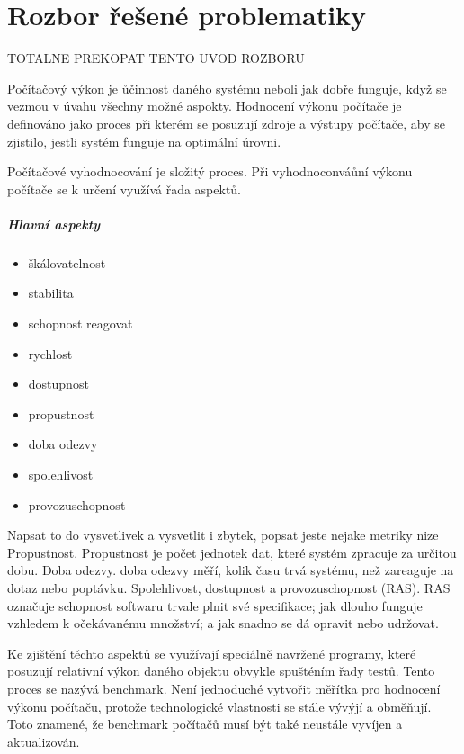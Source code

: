 \chapter{Rozbor řešené problematiky}

TOTALNE PREKOPAT TENTO UVOD ROZBORU

Počítačový výkon je ůčinnost daného systému neboli jak dobře funguje, když se vezmou v úvahu všechny možné aspokty.
Hodnocení výkonu počítače je definováno jako proces při kterém se posuzují zdroje a výstupy počítače, aby se zjistilo,
jestli systém funguje na optimální úrovni.

Počítačové vyhodnocování je složitý proces. Při vyhodnoconváůní výkonu počítače se k určení využívá řada aspektů.
\paragraph{Hlavní aspekty}\cite{MetricsToday}
\begin{itemize}
    \item{škálovatelnost}
    \item{stabilita}
    \item{schopnost reagovat}
    \item{rychlost}
    \item{dostupnost}
    \item{propustnost}
    \item{doba odezvy}
    \item{spolehlivost}
    \item{provozuschopnost}
\end{itemize}

Napsat to do vysvetlivek a vysvetlit i zbytek, popsat jeste nejake metriky nize
Propustnost. Propustnost je počet jednotek dat, které systém zpracuje za určitou dobu.
Doba odezvy. doba odezvy měří, kolik času trvá systému, než zareaguje na dotaz nebo poptávku.
Spolehlivost, dostupnost a provozuschopnost (RAS). RAS označuje schopnost softwaru trvale plnit své specifikace; jak dlouho funguje vzhledem k očekávanému množství; a jak snadno se dá opravit nebo udržovat.

Ke zjištění těchto aspektů se využívají speciálně navržené programy, které posuzují relativní výkon daného objektu obvykle spušténím řady testů.
Tento proces se nazývá benchmark. Není jednoduché vytvořit měřítka pro hodnocení výkonu počítaču, protože technologické vlastnosti se stále vývýjí a obměňují.
Toto znamené, že benchmark počítačů musí být také neustále vyvíjen a aktualizován.

